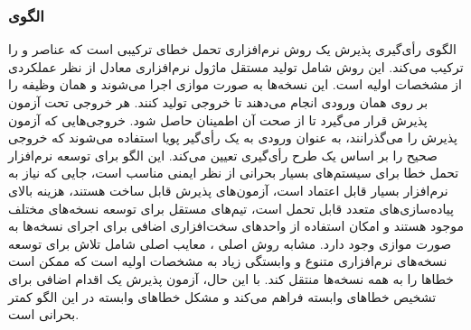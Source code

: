 \subsubsection{الگوی }
\label{ArmoushSWAccVoteSec}
\begin{RTL}
الگوی رأی‌گیری پذیرش  یک روش نرم‌افزاری تحمل خطای
ترکیبی است که عناصر  
و   را
ترکیب می‌کند. این روش شامل تولید مستقل 
ماژول‌ نرم‌افزاری معادل از نظر عملکردی از مشخصات اولیه است.
این نسخه‌ها به صورت موازی اجرا می‌شوند و همان وظیفه را بر روی
همان ورودی انجام می‌دهند تا  خروجی تولید کنند.
هر خروجی تحت آزمون پذیرش قرار می‌گیرد تا از صحت آن اطمینان
حاصل شود. خروجی‌هایی که آزمون پذیرش را می‌گذرانند، به عنوان ورودی
به یک رأی‌گیر پویا استفاده می‌شوند که خروجی صحیح
را بر اساس یک طرح رأی‌گیری تعیین می‌کند.
این الگو برای توسعه نرم‌افزار تحمل خطا برای سیستم‌های بسیار بحرانی
از نظر ایمنی مناسب است، جایی که نیاز به
نرم‌افزار بسیار قابل اعتماد است، آزمون‌های پذیرش
قابل ساخت هستند، هزینه بالای پیاده‌سازی‌های متعدد قابل تحمل
است، تیم‌های مستقل برای توسعه نسخه‌های مختلف موجود هستند و
امکان استفاده از واحدهای سخت‌افزاری اضافی برای اجرای نسخه‌ها
به صورت موازی وجود دارد. مشابه روش
اصلی ، معایب اصلی  شامل
تلاش برای توسعه نسخه‌های نرم‌افزاری متنوع و وابستگی زیاد به مشخصات
اولیه است که ممکن است خطاها را به همه نسخه‌ها منتقل کند.
با این حال، آزمون پذیرش یک اقدام اضافی برای تشخیص خطاهای
وابسته فراهم می‌کند و مشکل خطاهای وابسته در این الگو کمتر بحرانی است.
\end{RTL}